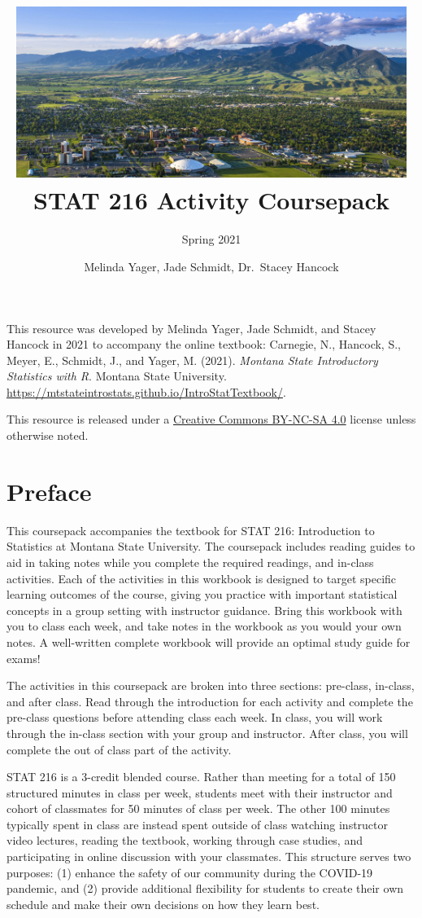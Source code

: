 \documentclass[
]{report}
\title{\includegraphics[width=5in,height=\textheight]{images/msu-campus.jpg}
\vspace{1cm}\\
STAT 216 Activity Coursepack}
\subtitle{Spring 2021}
\author{Melinda Yager, Jade Schmidt, Dr.~Stacey Hancock}
\date{}
\begin{document}
\maketitle

\newpage
\thispagestyle{empty}

This resource was developed by Melinda Yager, Jade Schmidt, and Stacey Hancock in 2021 to accompany the online textbook: Carnegie, N., Hancock, S., Meyer, E., Schmidt, J., and Yager, M. (2021). \emph{Montana State Introductory Statistics with R}. Montana State University. \url{https://mtstateintrostats.github.io/IntroStatTextbook/}.

This resource is released under a \href{https://creativecommons.org/licenses/by-nc-sa/4.0/}{Creative Commons BY-NC-SA 4.0} license unless otherwise noted.

\setcounter{tocdepth}{0}
\tableofcontents
\setcounter{page}{1}

\newpage

\hypertarget{preface}{%
\chapter*{Preface}\label{preface}}

This coursepack accompanies the textbook for STAT 216: Introduction to Statistics at Montana State University. The coursepack includes reading guides to aid in taking notes while you complete the required readings, and in-class activities. Each of the activities in this workbook is designed to target specific learning outcomes of the course, giving you practice with important statistical concepts in a group setting with instructor guidance. Bring this workbook with you to class each week, and take notes in the workbook as you would your own notes. A well-written complete workbook will provide an optimal study guide for exams!

The activities in this coursepack are broken into three sections: pre-class, in-class, and after class. Read through the introduction for each activity and complete the pre-class questions before attending class each week. In class, you will work through the in-class section with your group and instructor. After class, you will complete the out of class part of the activity.

STAT 216 is a 3-credit blended course. Rather than meeting for a total of 150 structured minutes in class per week, students meet with their instructor and cohort of classmates for 50 minutes of class per week. The other 100 minutes typically spent in class are instead spent outside of class watching instructor video lectures, reading the textbook, working through case studies, and participating in online discussion with your classmates. This structure serves two purposes: (1) enhance the safety of our community during the COVID-19 pandemic, and (2) provide additional flexibility for students to create their own schedule and make their own decisions on how they learn best.
\end{document}
